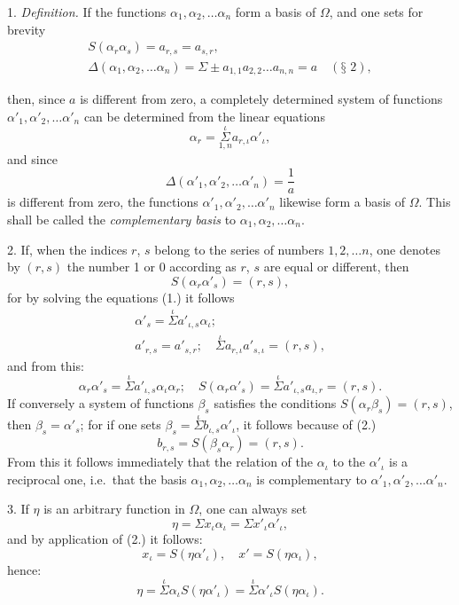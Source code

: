 \documentclass{article}
\begin{document}
1. \emph{Definition.} If the functions $\alpha_{1}, \alpha_{2}, \ldots \alpha_{n}$ form a basis of $\Omega$, and one sets for brevity
\[ \begin{gathered} S(\alpha_{r}\alpha_{s}) = a_{r,s} = a_{s,r}, \\ \Delta(\alpha_{1}, \alpha_{2}, \ldots \alpha_{n}) = \Sigma \pm a_{1,1}a_{2,2}\ldots a_{n,n} = a \quad (\text{§~2}), \end{gathered} \]

then, since $a$ is different from zero, a completely determined system of functions $\alpha'_{1}, \alpha'_{2}, \ldots \alpha'_{n}$ can be determined from the linear equations
\[ \alpha_{r} = \overset{\iota}{\underset{1,n}{\Sigma}} a_{r,\iota}\alpha'_{\iota}, \tag{1.} \]
and since
\[ \Delta(\alpha'_{1}, \alpha'_{2}, \ldots \alpha'_{n}) = \frac{1}{a} \]
is different from zero, the functions $\alpha'_{1}, \alpha'_{2}, \ldots \alpha'_{n}$ likewise form a basis of $\Omega$. This shall be called the \emph{complementary basis} to $\alpha_{1}, \alpha_{2}, \ldots \alpha_{n}$.

2. If, when the indices $r$, $s$ belong to the series of numbers $1, 2, \ldots n$, one denotes by $(r, s)$ the number 1 or 0 according as $r$, $s$ are equal or different, then
\[ S(\alpha_{r}\alpha'_{s}) = (r, s), \tag{2.} \]
for by solving the equations (1.) it follows
\[ \begin{gathered} \alpha'_{s} = \overset{\iota}{\Sigma} a'_{\iota,s}\alpha_{\iota}; \\ a'_{r,s} = a'_{s,r}; \quad \overset{\iota}{\Sigma} a_{r,\iota}a'_{s,\iota} = (r, s), \end{gathered} \]
and from this:
\[ \alpha_{r}\alpha'_{s} = \overset{\iota}{\Sigma} a'_{\iota,s}\alpha_{\iota}\alpha_{r}; \quad S(\alpha_{r}\alpha'_{s}) = \overset{\iota}{\Sigma} a'_{\iota,s}a_{\iota,r} = (r, s). \]
If conversely a system of functions $\beta_{s}$ satisfies the conditions $S(\alpha_{r}\beta_{s}) = (r, s)$, then $\beta_{s} = \alpha'_{s}$; for if one sets $\beta_{s} = \overset{\iota}{\Sigma} b_{\iota,s}\alpha'_{\iota}$, it follows because of (2.)
\[ b_{r,s} = S(\beta_{s}\alpha_{r}) = (r, s). \]
From this it follows immediately that the relation of the $\alpha_{\iota}$ to the $\alpha'_{\iota}$ is a reciprocal one, i.e.\ that the basis $\alpha_{1}, \alpha_{2}, \ldots \alpha_{n}$ is complementary to $\alpha'_{1}, \alpha'_{2}, \ldots \alpha'_{n}$.

3. If $\eta$ is an arbitrary function in $\Omega$, one can always set
\[ \eta = \Sigma x_{\iota}\alpha_{\iota} = \Sigma x'_{\iota}\alpha'_{\iota}, \]
and by application of (2.) it follows:
\[ x_{\iota} = S(\eta\alpha'_{\iota}), \quad x' = S(\eta\alpha_{\iota}), \]
hence:
\[ \eta = \overset{\iota}{\Sigma}\alpha_{\iota}S(\eta\alpha'_{\iota}) = \overset{\iota}{\Sigma}\alpha'_{\iota}S(\eta\alpha_{\iota}). \tag{3.} \]
\end{document}
